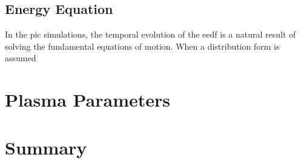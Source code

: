 \subsection{Energy Equation}

In the \acs{pic} simulations, the temporal evolution of the \acs{eedf} is a
natural result of solving the fundamental equations of motion. When a
distribution form is assumed 


\section{Plasma Parameters}



\section{Summary}



